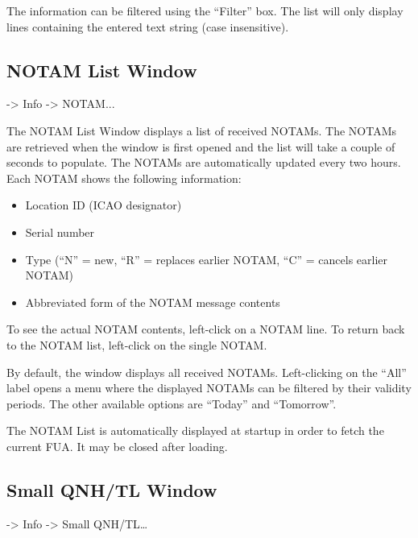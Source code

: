 \documentclass[a4paper,oneside,11pt]{memoir}
\begin{document}
\bigskip

The information can be filtered using the “Filter” box. The list will only display lines containing the entered text string (case insensitive).

\subsection{NOTAM List Window}
\label{win:notamlw}

 -> Info -> NOTAM...

\bigskip


The NOTAM List Window displays a list of received NOTAMs. The NOTAMs are retrieved when the window is first opened and the list will take a couple of seconds to populate. The NOTAMs are automatically updated every two hours. Each NOTAM shows the following information:

\begin{itemize}
    \item Location ID (ICAO designator)
    \item Serial number
    \item Type (“N” = new, “R” = replaces earlier NOTAM, “C” = cancels earlier NOTAM)
    \item Abbreviated form of the NOTAM message contents
\end{itemize}

\bigskip

To see the actual NOTAM contents, left-click on a NOTAM line. To return back to the NOTAM list, left-click on the single NOTAM.

\bigskip

By default, the window displays all received NOTAMs. Left-clicking on the “All” label opens a menu where the displayed NOTAMs can be filtered by their validity periods. The other available options are “Today” and “Tomorrow”.

\bigskip

The NOTAM List is automatically displayed at startup in order to fetch the current FUA. It may be closed after loading.

\subsection{Small QNH/TL Window}\label{win:sqnhw}

 -> Info -> Small QNH/TL…
\end{document}
